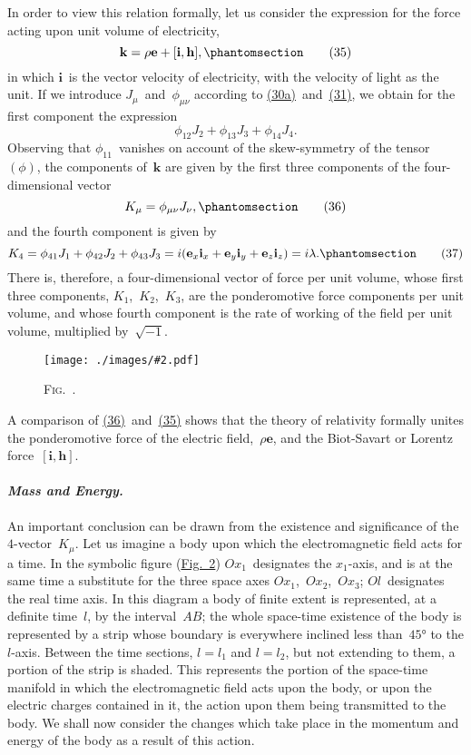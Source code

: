 \documentclass[12pt]{book}[2005/09/16]
\newcommand{\Paragraph}[1]{\paragraph*{\indent\normalfont\itshape#1}}
\newcounter{figno}
\newcommand{\Figure}[2][0.75\textwidth]{%
\begin{figure}[hbt!]
  \refstepcounter{figno}
  \centering
  \texttt{[image: ./images/\#2.pdf]}
  \caption{\textsc{Fig}.~\thefigno.}
  \label{fig:\thefigno}
\end{figure}
}
\newcommand{\Change}[2]{#2}
\newcommand{\Add}[1]{\Change{}{#1}}
\newcommand{\PageSep}[1]{\ignorespaces}
\newcommand{\Tag}[1]{%
  \phantomsection
  \label{eqn:#1}
  \tag*{#1}
}
\newcommand{\Eqref}[1]{\hyperref[eqn:#1]{#1}}
\newcommand{\Figref}[1]{\hyperref[fig:#1]{Fig.~#1}}
\newcommand{\Vector}[1]{\mathbf{#1}}
\newcommand{\e}{\Vector{e}}
\newcommand{\h}{\Vector{h}}
\newcommand{\veci}{\Vector{i}}
\renewcommand{\k}{\Vector{k}}
\begin{document}
In order to view this relation formally, let us consider
the expression for the force acting upon unit volume of
electricity,
\[
\k = \rho\e + [\veci, \h]\Add{,}
\Tag{(35)}
\]
in which $\veci$~is the vector velocity of electricity, with the
velocity of light as the unit. If we introduce $J_{\mu}$~and~$\phi_{\mu\Change{}{\nu}}$
according to \Eqref{(30a)}~and~\Eqref{(31)}, we obtain for the first
component the expression
\[
\phi_{12} J_{2} + \phi_{13} J_{3} + \phi_{14} J_{4}.
\]
Observing that $\phi_{11}$~vanishes on account of the skew-symmetry
of the tensor~$(\phi)$, the components of~$\Change{k}{\k}$ are given
by the first three components of the four-dimensional
vector
\[
K_{\mu} = \phi_{\mu\nu} J_{\nu}\Add{,}
\Tag{(36)}
\]
and the fourth component is given by
\[
K_{4} = \phi_{41} J_{1} + \phi_{42} J_{2} + \phi_{43} J_{3}
  = \Change{\veci}{i}(\e_{x} \veci_{x} + \e_{y} \veci_{y} + \e_{z} \veci_{z})
  = \Change{\veci}{i}\lambda\Add{.}
\Tag{(37)}
\]
\PageSep{47}
There is, therefore, a four-dimensional vector of force per
unit volume, whose first three components, $\Change{k}{K}_{1}$,~$\Change{k}{K}_{2}$,~$\Change{k}{K}_{3}$, are
the ponderomotive force components per unit volume, and
whose fourth component is the rate of working of the field
per unit volume, multiplied by~$\sqrt{-1}$.
\Figure{047}

A comparison of \Eqref{(36)}~and~\Eqref{(35)} shows that the theory
of relativity formally unites the ponderomotive force of
the electric field,~$\rho\e$, and the Biot-Savart or Lorentz
force~$[\veci, \h]$.
\PageSep{48}

\Paragraph{Mass and Energy.} An important conclusion can be
%
%
drawn from the existence and significance of the $4$-vector~$K_{\mu}$.
Let us imagine a body upon which the electromagnetic
field acts for a time. In the symbolic figure
(\Figref{2}) $Ox_{1}$~designates the $x_{1}$-axis, and is at the same
time a substitute for the three space axes $Ox_{1}$,~$Ox_{2}$,~$Ox_{3}$;
$Ol$~designates the real time axis. In this diagram a body
of finite extent is represented, at a definite time~$l$, by the
interval~$AB$; the whole space-time existence of the body
is represented by a strip whose boundary is everywhere
inclined less than~$45°$ to the $l$-axis. Between the time
sections, $l = l_{1}$ and $l = l_{2}$, but not extending to them,
a portion of the strip is shaded. This represents the
portion of the space-time manifold in which the electromagnetic
field acts upon the body, or upon the electric
charges contained in it, the action upon them being
transmitted to the body. We shall now consider the
changes which take place in the momentum and energy
of the body as a result of this action.
\end{document}
